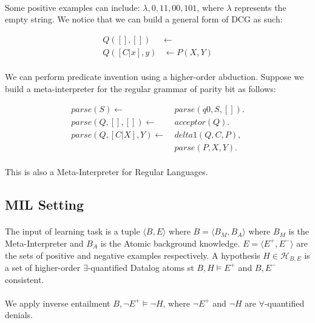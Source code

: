 \documentclass{article}
\theoremstyle{plain}
\theoremstyle{definition}
\begin{document}
\begin{multicols}{2}
\paragraph{} Some positive examples can include: $\lambda, 0, 11, 00, 101$, where $\lambda$ represents the empty string. We notice that we can build a general form of DCG as such:

\begin{align*}
Q([], []) &\leftarrow\\
Q([C|x],y) &\leftarrow P(X, Y)
\end{align*}

\paragraph{} We can perform predicate invention using a higher-order abduction. Suppose we build a meta-interpreter for the regular grammar of parity bit as follows:

\begin{align*}
parse(S) \leftarrow\ &parse(q0, S, []).\\
parse(Q, [], []) \leftarrow\ &acceptor(Q).\\
parse(Q, [C|X], Y) \leftarrow\ &delta1(Q, C, P),\\ &parse(P, X, Y).
\end{align*}

\paragraph{} This is also a Meta-Interpreter for Regular Languages.

\subsection{MIL Setting}

\paragraph{} The input of learning task is a tuple $\langle B, E\rangle$ where $B = \langle B_M, B_A \rangle$ where $B_M$ is the Meta-Interpreter and $B_A$ is the Atomic background knowledge. $E = \langle E^+, E^- \rangle$ are the sets of positive and negative examples respectively. A hypothesis $H \in \mathcal{H}_{B,E}$ is a set of higher-order $\exists$-quantified Datalog atoms st $B, H \models E^+$ and $B, E^-$ consistent.

\paragraph{} We apply inverse entailment $B, \lnot E^+ \models \lnot H$, where $\lnot E^+$ and $\lnot H$ are $\forall$-quantified denials.


\end{multicols}
\end{document}
